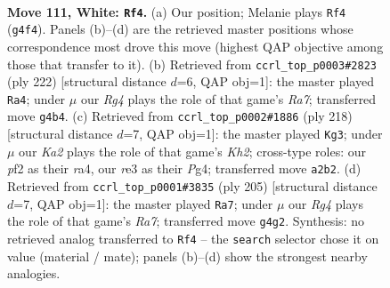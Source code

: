 \documentclass[11pt]{article}
\begin{document}
\clearpage

\begin{figure}[p]\centering
\begin{subfigure}{0.46\textwidth}\centering
\resizebox{\linewidth}{!}{%
\newchessgame
\chessboard[
  setfen={1B5k/8/8/7P/6R1/4r3/K4p2/8 w - - 0 111},
  showmover=false,
  pgfstyle=straightmove, color=movearrow, markmove={g4-f4}
]}
\caption{}
\end{subfigure}\hfill
\begin{subfigure}{0.46\textwidth}\centering
\resizebox{\linewidth}{!}{%
\newchessgame
\chessboard[
  setfen={2r2k2/R7/4p3/8/8/3K2B1/8/8 w - - 19 112},
  showmover=false,
  pgfstyle=straightmove, color=movearrow, markmove={a7-a4}
]}
\caption{}
\end{subfigure}
\\[4pt]
\begin{subfigure}{0.46\textwidth}\centering
\resizebox{\linewidth}{!}{%
\newchessgame
\chessboard[
  setfen={8/6k1/3R4/6p1/r5P1/8/5P1K/8 w - - 49 110},
  showmover=false,
  pgfstyle=straightmove, color=movearrow, markmove={h2-g3}
]}
\caption{}
\end{subfigure}\hfill
\begin{subfigure}{0.46\textwidth}\centering
\resizebox{\linewidth}{!}{%
\newchessgame
\chessboard[
  setfen={3R4/8/5P2/8/5kp1/8/r7/5K2 b - - 5 103},
  showmover=false,
  pgfstyle=straightmove, color=movearrow, markmove={a2-a7}
]}
\caption{}
\end{subfigure}
\caption{\textbf{Move 111, White: \texttt{Rf4}.} (a) Our position; Melanie plays \texttt{Rf4} (\texttt{g4f4}). Panels (b)--(d) are the retrieved master positions whose correspondence most drove this move (highest QAP objective among those that transfer to it). (b) Retrieved from \texttt{ccrl\_top\_p0003\#2823} (ply 222) [structural distance $d$=6, QAP obj=1]: the master played \texttt{Ra4}; under $\mu$ our \emph{Rg4} plays the role of that game's \emph{Ra7}; transferred move \texttt{g4b4}. (c) Retrieved from \texttt{ccrl\_top\_p0002\#1886} (ply 218) [structural distance $d$=7, QAP obj=1]: the master played \texttt{Kg3}; under $\mu$ our \emph{Ka2} plays the role of that game's \emph{Kh2}; cross-type roles: our \emph{p}f2 as their \emph{r}a4, our \emph{r}e3 as their \emph{P}g4; transferred move \texttt{a2b2}. (d) Retrieved from \texttt{ccrl\_top\_p0001\#3835} (ply 205) [structural distance $d$=7, QAP obj=1]: the master played \texttt{Ra7}; under $\mu$ our \emph{Rg4} plays the role of that game's \emph{Ra7}; transferred move \texttt{g4g2}. Synthesis: no retrieved analog transferred to \texttt{Rf4} -- the \texttt{search} selector chose it on value (material / mate); panels (b)--(d) show the strongest nearby analogies.}
\label{fig:thought-m220}
\end{figure}
\end{document}
